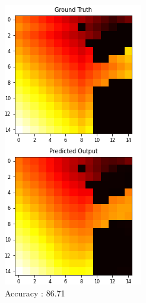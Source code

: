 \begin{figure}[!htb]
   \begin{minipage}{0.5\textwidth}
     \centering
     \includegraphics[width=.7\linewidth]{../openreview/images/media_images_test_samples_4516_0(1)(1)(1).png}
    \caption{Accuracy : 86.71}
   \end{minipage}\hfill
   \begin{minipage}{0.5\textwidth}
     \centering

\end{minipage}
\end{figure}
